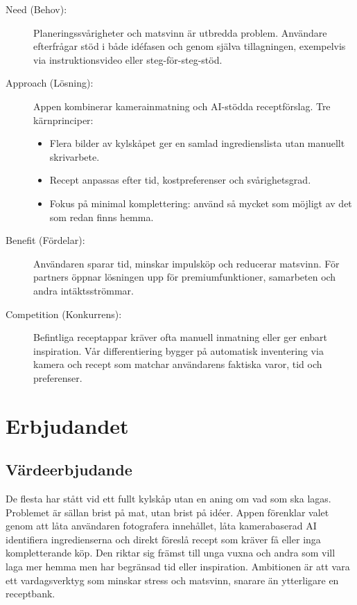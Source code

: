 \documentclass[a4paper,12pt]{article}
\begin{document}
\begin{description}
    \item[Need (Behov):] Planeringssvårigheter och matsvinn är utbredda problem. Användare efterfrågar stöd i både idéfasen och genom själva tillagningen, exempelvis via instruktionsvideo eller steg-för-steg-stöd.
    \item[Approach (Lösning):] Appen kombinerar kamerainmatning och AI-stödda receptförslag. Tre kärnprinciper:
    \begin{itemize}
        \item Flera bilder av kylskåpet ger en samlad ingredienslista utan manuellt skrivarbete.
        \item Recept anpassas efter tid, kostpreferenser och svårighetsgrad.
        \item Fokus på minimal komplettering: använd så mycket som möjligt av det som redan finns hemma.
    \end{itemize}
    \item[Benefit (Fördelar):] Användaren sparar tid, minskar impulsköp och reducerar matsvinn. För partners öppnar lösningen upp för premiumfunktioner, samarbeten och andra intäktsströmmar.
    \item[Competition (Konkurrens):] Befintliga receptappar kräver ofta manuell inmatning eller ger enbart inspiration. Vår differentiering bygger på automatisk inventering via kamera och recept som matchar användarens faktiska varor, tid och preferenser.
\end{description}





\section{Erbjudandet}

\subsection{Värdeerbjudande}
De flesta har stått vid ett fullt kylskåp utan en aning om vad som ska lagas. Problemet är sällan brist på mat, utan brist på idéer. Appen förenklar valet genom att låta användaren fotografera innehållet, låta kamerabaserad AI identifiera ingredienserna och direkt föreslå recept som kräver få eller inga kompletterande köp. Den riktar sig främst till unga vuxna och andra som vill laga mer hemma men har begränsad tid eller inspiration. Ambitionen är att vara ett vardagsverktyg som minskar stress och matsvinn, snarare än ytterligare en receptbank.
\end{document}
